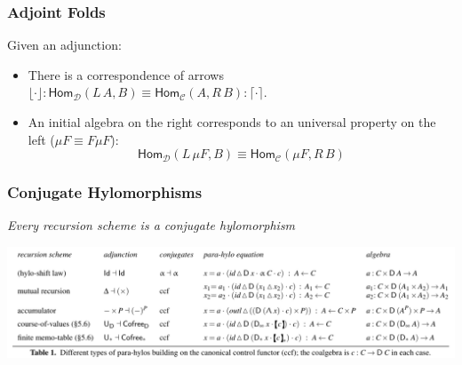 \begin{frame}[fragile]
  \frametitle{Adjoint Folds}
  Given an adjunction:

  \begin{center}\LARGE
  \end{center}

 \begin{itemize}
   \item There is a correspondence of arrows 
     $\lfloor\cdot\rfloor : \mathsf{Hom}_{\mathcal{D}}(L\, A,B) \equiv 
     \mathsf{Hom}_{\mathcal{C}}(A,R\, B) : \lceil\cdot\rceil$.
   \item An initial algebra on the right corresponds to an universal property
     on the left ($\mu F \equiv F \mu F$):
     {\large
     \[
       \mathsf{Hom}_{\mathcal{D}}(L\, \mu F, B) \equiv \mathsf{Hom}_{\mathcal{C}}(\mu F,R\, B)
     \]}
 \end{itemize}
\end{frame}

\begin{frame}[fragile]
  \frametitle{Conjugate Hylomorphisms}
  \centering
  {\Large\emph{Every recursion scheme is a conjugate hylomorphism}}%

  \vspace{.4cm}

  \begin{sticky}\includegraphics[width=\textwidth]{figures/types-of-parahylos-crop.pdf}\end{sticky}
\end{frame}

